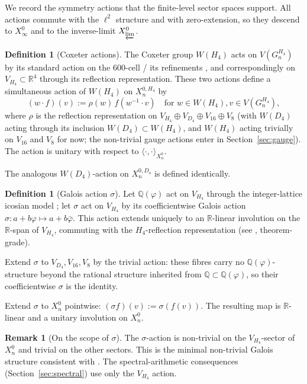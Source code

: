 \documentclass[11pt, a4paper]{amsart}
\theoremstyle{definition}
\newtheorem{definition}[theorem]{Definition}
\newtheorem{remark}[theorem]{Remark}
\newcommand{\R}{\mathbb{R}}
\newcommand{\Q}{\mathbb{Q}}
\newcommand{\pphi}{\varphi}
\begin{document}
We record the symmetry actions that the finite-level sector spaces
support. All actions commute with the $\ell^2$ structure and with
zero-extension, so they descend to $X^0_\infty$ and to the
inverse-limit $X^0_{\varprojlim}$.

\begin{definition}[Coxeter actions]
\label{def:coxeter-actions}
The Coxeter group $W(H_4)$ acts on $V(G_n^{H_4})$ by its standard
action on the 600-cell / its refinements
\cite[\S 3]{CascadeEmbeddings}, and correspondingly on
$V_{H_4} \subset \R^4$ through its reflection representation. These
two actions define a simultaneous action of $W(H_4)$ on
$X_n^{0,H_4}$ by
\[
  (w \cdot f)(v) := \rho(w) \, f(w^{-1} \cdot v)
  \quad \text{for } w \in W(H_4), v \in V(G_n^{H_4}),
\]
where $\rho$ is the reflection representation on
$V_{H_4} \oplus V_{D_4} \oplus V_{16} \oplus V_8$ (with $W(D_4)$
acting through its inclusion $W(D_4) \subset W(H_4)$, and
$W(H_4)$ acting trivially on $V_{16}$ and $V_8$ for now; the
non-trivial gauge actions enter in Section~\ref{sec:gauge}).
The action is unitary with respect to
$\langle\cdot, \cdot\rangle_{X_n^0}$.

The analogous $W(D_4)$-action on $X_n^{0, D_4}$ is defined
identically.
\end{definition}

\begin{definition}[Galois action $\sigma$]
\label{def:sigma-action-subst}
Let $\Q(\pphi)$ act on $V_{H_4}$ through the integer-lattice icosian
model \cite[\S 3.1]{CascadeEmbeddings}; let $\sigma$ act on
$V_{H_4}$ by its coefficientwise Galois action
$\sigma \colon a + b \pphi \mapsto a + b \bar\pphi$. This action
extends uniquely to an $\R$-linear involution on the $\R$-span of
$V_{H_4}$, commuting with the $H_4$-reflection representation (see
\cite[\S F5]{CascadeFoundations}, theorem-grade).

Extend $\sigma$ to $V_{D_4}, V_{16}, V_8$ by the trivial action:
these fibres carry no $\Q(\pphi)$-structure beyond the rational
structure inherited from $\Q \subset \Q(\pphi)$, so their
coefficientwise $\sigma$ is the identity.

Extend $\sigma$ to $X_n^0$ pointwise:
$(\sigma f)(v) := \sigma(f(v))$. The resulting map is $\R$-linear
and a unitary involution on $X_n^0$.
\end{definition}

\begin{remark}[On the scope of $\sigma$]
The $\sigma$-action is non-trivial on the $V_{H_4}$-sector of
$X_n^0$ and trivial on the other sectors. This is the minimal
non-trivial Galois structure consistent with
\cite[\S F5]{CascadeFoundations}. The spectral-arithmetic
consequences (Section~\ref{sec:spectral}) use only the $V_{H_4}$
action.
\end{remark}
\end{document}
